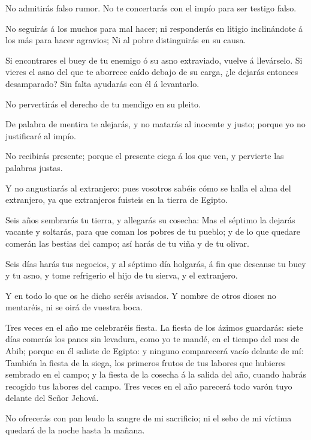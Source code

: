  No admitirás falso rumor. No te concertarás con el impío
para ser testigo falso.

 No seguirás á los muchos para mal hacer; ni responderás en
litigio inclinándote á los más para hacer agravios;  Ni al
pobre distinguirás en su causa.

 Si encontrares el buey de tu enemigo ó su asno extraviado,
vuelve á llevárselo.  Si vieres el asno del que te aborrece
caído debajo de su carga, ¿le dejarás entonces desamparado? Sin falta
ayudarás con él á levantarlo.

 No pervertirás el derecho de tu mendigo en su pleito.

 De palabra de mentira te alejarás, y no matarás al inocente
y justo; porque yo no justificaré al impío.

 No recibirás presente; porque el presente ciega á los que
ven, y pervierte las palabras justas.

 Y no angustiarás al extranjero: pues vosotros sabéis cómo
se halla el alma del extranjero, ya que extranjeros fuisteis en la
tierra de Egipto.

 Seis años sembrarás tu tierra, y allegarás su cosecha:
 Mas el séptimo la dejarás vacante y soltarás, para que
coman los pobres de tu pueblo; y de lo que quedare comerán las bestias
del campo; así harás de tu viña y de tu olivar.

 Seis días harás tus negocios, y al séptimo día holgarás, á
fin que descanse tu buey y tu asno, y tome refrigerio el hijo de tu
sierva, y el extranjero.

 Y en todo lo que os he dicho seréis avisados. Y nombre de
otros dioses no mentaréis, ni se oirá de vuestra boca.

 Tres veces en el año me celebraréis fiesta. 
La fiesta de los ázimos guardarás: siete días comerás los panes sin
levadura, como yo te mandé, en el tiempo del mes de Abib; porque en él
saliste de Egipto: y ninguno comparecerá vacío delante de mí:
 También la fiesta de la siega, los primeros frutos de tus
labores que hubieres sembrado en el campo; y la fiesta de la cosecha á
la salida del año, cuando habrás recogido tus labores del campo.
 Tres veces en el año parecerá todo varón tuyo delante del
Señor Jehová.

 No ofrecerás con pan leudo la sangre de mi sacrificio; ni
el sebo de mi víctima quedará de la noche hasta la mañana.

